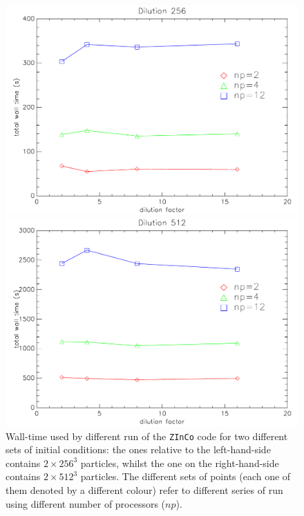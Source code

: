\documentclass[11pt,a4paper,titlepage]{article}
\newcommand{\zinco}{\texttt{ZInCo}\xspace}
\begin{document}
\begin{figure}[!tb]
\begin{minipage}{0.45\textwidth}
\includegraphics[width=\textwidth]{benchmark_wtaVSdil_256.pdf}
\end{minipage}
\begin{minipage}{0.45\textwidth}
\begin{flushright}
\includegraphics[width=\textwidth]{benchmark_wtaVSdil_512.pdf}
\end{flushright}
\end{minipage}
\caption{Wall-time used by different run of the \zinco code for two different sets of initial conditions: the ones relative to the left-hand-side contains $2 \times 256^3$ particles, whilst the one on the right-hand-side contains $2 \times 512^3$ particles. The different sets of points (each one of them denoted by a different colour) refer to different series of run using different number of processors ($np$).}
\label{benchmark_wtaVSdil}
\end{figure}
\end{document}

